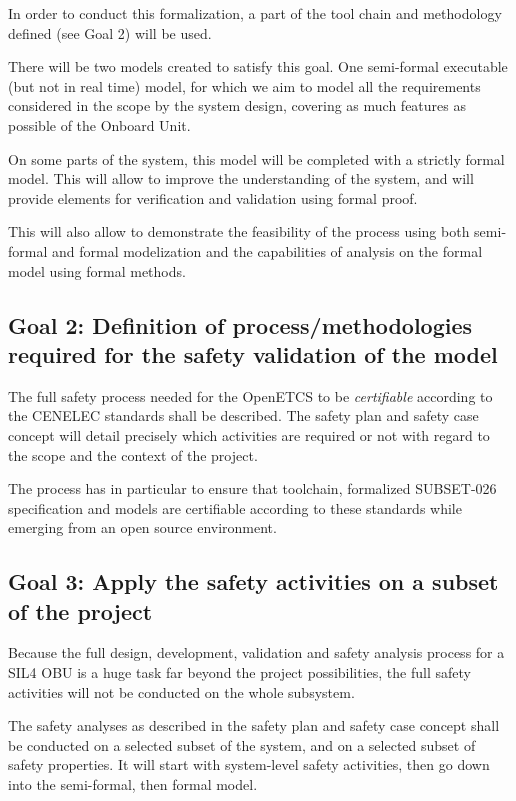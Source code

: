 \documentclass{template/openetcs_article}
\begin{document}
In order to conduct this formalization, a part of the tool chain and methodology defined (see Goal 2) 
will be used.

There will be two models created to satisfy this goal. One semi-formal executable (but not in real time)
model, for which we aim to model all the requirements considered in the scope by the system design, covering as
much features as possible of the Onboard Unit.

On some parts of the system, this model will be completed with a strictly formal model. This will allow to improve
the understanding of the system, and will provide elements for verification and validation using formal proof. 

This will also allow to demonstrate the feasibility of the process using both semi-formal and formal modelization 
and the capabilities of analysis on the formal model using formal methods. 

\subsection{Goal 2: Definition of process/methodologies required for the safety validation
of the model}

The full safety process needed for the OpenETCS to be \emph{certifiable} according to the CENELEC standards
shall be described. The safety plan and safety case concept will detail precisely which activities 
are required or not with regard to the scope and the context of the project.

The process has in particular to ensure that toolchain, formalized SUBSET-026 specification and models are certifiable 
according to these standards while emerging from an open source environment. 

\subsection{Goal 3: Apply the safety activities on a subset of the project}
Because the full design, development, validation and safety analysis process for a SIL4 OBU
is a huge task far beyond the project possibilities, the full safety activities will not be conducted
on the whole subsystem. 

The safety analyses as described in the safety plan and safety case concept shall be conducted on a selected 
subset of the system, and on a selected subset of safety properties. It will start with system-level safety 
activities, then go down into the semi-formal, then formal model.
\end{document}
